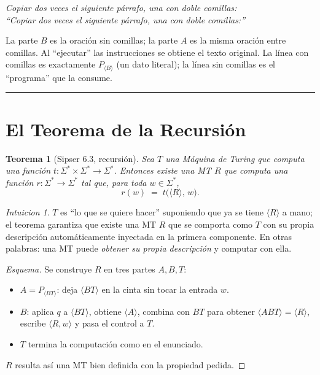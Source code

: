 \documentclass[11pt,a4paper]{article}
\theoremstyle{plain}
\newtheorem{teorema}{Teorema}[section]
\theoremstyle{definition}
\theoremstyle{remark}
\newtheorem*{intuicion}{Intuicion}
\newcommand{\enc}[1]{\langle #1\rangle}
\newcommand{\Sstar}{\Sigma^{*}}
\newcommand{\Pw}[1]{P_{#1}}
\begin{document}
\begin{center}\emph{
  Copiar dos veces el siguiente p\'arrafo, una con doble comillas:\\
  ``Copiar dos veces el siguiente p\'arrafo, una con doble comillas:''}
\end{center}

La parte $B$ es la oraci\'on sin comillas; la parte $A$ es la misma oraci\'on
entre comillas. Al ``ejecutar'' las instrucciones se obtiene el texto
original. La l\'inea con comillas es exactamente $\Pw{\enc{B}}$ (un dato
literal); la l\'inea sin comillas es el ``programa'' que la consume.

\bigskip\hrule\bigskip

\section{El Teorema de la Recursi\'on}

\begin{teorema}[Sipser 6.3, recursi\'on]
\label{teo:recursion}
Sea $T$ una M\'aquina de Turing que computa una funci\'on
$t: \Sstar\times\Sstar \to \Sstar$. Entonces existe una MT $R$ que computa
una funci\'on $r:\Sstar\to\Sstar$ tal que, para toda $w\in\Sstar$,
\[
  r(w) \;=\; t\bigl(\enc{R},\, w\bigr).
\]
\end{teorema}

\begin{intuicion}
$T$ es ``lo que se quiere hacer'' suponiendo que ya se tiene $\enc{R}$ a
mano; el teorema garantiza que existe una MT $R$ que se comporta como $T$
con su propia descripci\'on autom\'aticamente inyectada en la primera
componente. En otras palabras: una MT puede \emph{obtener su propia
descripci\'on} y computar con ella.
\end{intuicion}

\begin{proof}[Esquema]
Se construye $R$ en tres partes $A,B,T$:
\begin{itemize}
  \item $A=\Pw{\enc{BT}}$: deja $\enc{BT}$ en la cinta sin tocar la entrada
        $w$.
  \item $B$: aplica $q$ a $\enc{BT}$, obtiene $\enc{A}$, combina con $BT$
        para obtener $\enc{ABT}=\enc{R}$, escribe $\enc{R,w}$ y pasa el
        control a $T$.
  \item $T$ termina la computaci\'on como en el enunciado.
\end{itemize}
$R$ resulta as\'i una MT bien definida con la propiedad pedida.
\end{proof}
\end{document}
